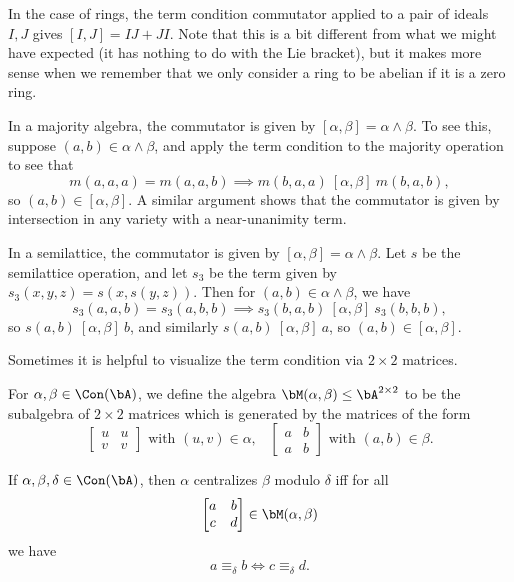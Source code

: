 \begin{ex} In the case of rings, the term condition commutator applied to a pair of ideals $I,J$ gives $[I,J] = IJ + JI$. Note that this is a bit different from what we might have expected (it has nothing to do with the Lie bracket), but it makes more sense when we remember that we only consider a ring to be abelian if it is a zero ring.
\end{ex}

\begin{ex} In a majority algebra, the commutator is given by $[\alpha,\beta] = \alpha \wedge \beta$. To see this, suppose $(a,b) \in \alpha \wedge \beta$, and apply the term condition to the majority operation to see that
\[
m(\boxed{a},a,a) = m(\boxed{a},a,b) \implies m(\boxed{b},a,a)\ [\alpha,\beta]\ m(\boxed{b},a,b),
\]
so $(a,b) \in [\alpha,\beta]$. A similar argument shows that the commutator is given by intersection in any variety with a near-unanimity term.
\end{ex}

\begin{ex}\label{semi-sd-meet} In a semilattice, the commutator is given by $[\alpha,\beta] = \alpha\wedge\beta$. Let $s$ be the semilattice operation, and let $s_3$ be the term given by $s_3(x,y,z) = s(x,s(y,z))$. Then for $(a,b) \in \alpha\wedge\beta$, we have
\[
s_3(\boxed{a},a,b) = s_3(\boxed{a},b,b) \implies s_3(\boxed{b},a,b)\ [\alpha,\beta]\ s_3(\boxed{b},b,b),
\]
so $s(a,b)\ [\alpha,\beta]\ b$, and similarly $s(a,b)\ [\alpha,\beta]\ a$, so $(a,b) \in [\alpha,\beta]$.
\end{ex}

Sometimes it is helpful to visualize the term condition via $2\times 2$ matrices.

\begin{defn}\label{commutator-matrix} For $\alpha, \beta \in \Con(\bA)$, we define the algebra $\bM(\alpha,\beta) \le \bA^{2\times 2}$ to be the subalgebra of $2\times 2$ matrices which is generated by the matrices of the form
\[
\begin{bmatrix} u & u\\ v & v\end{bmatrix} \text{ with } (u,v) \in \alpha, \;\;\; \begin{bmatrix} a & b\\ a & b\end{bmatrix} \text{ with } (a,b) \in \beta.
\]
\end{defn}

\begin{prop} If $\alpha, \beta, \delta \in \Con(\bA)$, then $\alpha$ centralizes $\beta$ modulo $\delta$ iff for all
\[
\begin{bmatrix} a & b\\ c & d\end{bmatrix} \in \bM(\alpha,\beta)
\]
we have
\[
a \equiv_\delta b \iff c \equiv_\delta d.
\]
\end{prop}

